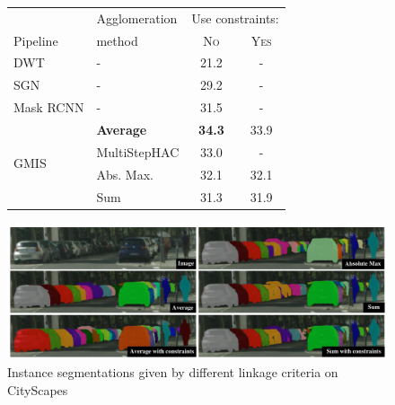 \begin{figure}[t]
\centering
\begin{minipage}[b]{0.5\textwidth}
    \centering
    \scriptsize
        \begin{tabular}{l|l|cc}
           & Agglomeration  &  \multicolumn{2}{c}{Use constraints:} \\
          Pipeline & method & \textsc{No} & \textsc{Yes} \\ \midrule
DWT \cite{bai2017deep} & - & 21.2 & - \\
SGN \cite{liu2017sgn} & - & 29.2 & - \\
Mask RCNN \cite{he2017mask} & - & 31.5 & - \\ \hline
 & \textbf{\algname{} Average}& \textbf{34.3}  & 33.9  \\
\multirow{2}{*}{GMIS \cite{liu2018affinity}} & MultiStepHAC \cite{liu2018affinity} & 33.0 & -  \\
 & \algname{} Abs. Max. \cite{wolf2018mutex}  & 32.1 & 32.1 \\
 & \algname{} Sum \cite{keuper2015efficient,levinkov2017comparative} & 31.3  & 31.9  \\
        \end{tabular}
    \label{tab:results_cityscapes_val}
\end{minipage}\hfill
\begin{minipage}[b]{0.46\textwidth}
    \centering
\includegraphics[width=\textwidth]{./figs/cityscapes_compare_3.pdf} %
\caption{Instance segmentations given by different \algname{} linkage criteria on CityScapes}\label{fig:cityscapes}
\end{minipage}
\end{figure}
